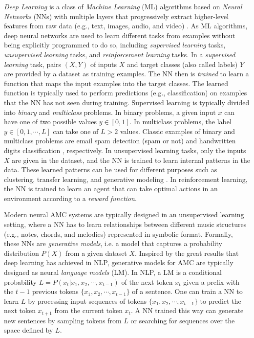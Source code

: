 \textit{Deep Learning} is a class of \textit{Machine Learning} (ML) algorithms based on \textit{Neural Networks} (NNs) with multiple layers that progressively extract higher-level features from raw data (e.g., text, images, audio, and video) \cite{goodfellow2016deep}. As ML algorithms, deep neural networks are used to learn different tasks from examples without being explicitly programmed to do so, including \textit{supervised learning} tasks, \textit{unsupervised learning} tasks, and \textit{reinforcement learning} tasks. In a \textit{supervised learning} task, pairs $(X,Y)$ of inputs $X$ and target classes (also called labels) $Y$ are provided by a dataset as training examples. The NN then is \textit{trained} to learn a function that maps the input examples into the target classes. The learned function is typically used to perform predictions (e.g., classification) on examples that the NN has not seen during training. Supervised learning is typically divided into \textit{binary} and \textit{multiclass} problems. In binary problems, a given input $x$ can have one of two possible values $y \in [0, 1]$. In multiclass problems, the label $y \in [0, 1, \cdots, L]$ can take one of $L > 2$ values. Classic examples of binary and multiclass problems are email spam detection (spam or not) and handwritten digits classification \cite{lecun1998gradient}, respectively. In unsupervised learning tasks, only the inputs $X$ are given in the dataset, and the NN is trained to learn internal patterns in the data. These learned patterns can be used for different purposes such as clustering, transfer learning, and generative modeling \cite{bengio2012unsupervised}. In reinforcement learning, the NN is trained to learn an agent that can take optimal actions in an environment according to a \textit{reward function}.

Modern neural AMC systems are typically designed in an unsupervised learning setting, where a NN has to learn relationships between different music structures (e.g., notes, chords, and melodies) represented in symbolic format. Formally, these NNs are \textit{generative models}, i.e. a model that captures a probability distribution $P(X)$ from a given dataset $X$. Inspired by the great results that deep learning has achieved in NLP, generative models for AMC are typically designed as neural \textit{language models} (LM). In NLP, a LM is a conditional probability $L = P(x_t|x_1, x_2, \cdots, x_{t-1})$ of the next token $x_t$ given a prefix with the $t-1$ previous tokens $\{x_1, x_2, \cdots, x_{t-1}\}$ of a sentence. One can train a NN to learn $L$ by processing input sequences of tokens $\{x_1, x_2, \cdots, x_{t-1}\}$ to predict the next token $x_{t+1}$ from the current token $x_t$. A NN trained this way can generate new sentences by sampling tokens from $L$ or searching for sequences over the space defined by $L$.

